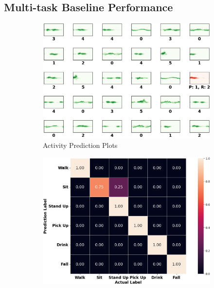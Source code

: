 \documentclass{l4proj}
\begin{document}
\begin{appendices}
\newpage

\subsection{Multi-task Baseline Performance}
\begin{figure}[h]
    \centering
    \begin{subfigure}{0.45\textwidth}
        \includegraphics[width=\textwidth]{images/privacy-preservation-basecase-activity-prediction-plots.png}
        \caption{Activity Prediction Plots}
        \label{fig:privacy-preservation-basecase-activity-prediction-plots}
    \end{subfigure}
    \qquad
    \begin{subfigure}{0.45\textwidth}
        \includegraphics[width=\textwidth]{images/privacy-preservation-basecase-activity-confusion-matrix.png}

\end{subfigure}
\end{figure}
\end{appendices}
\end{document}
